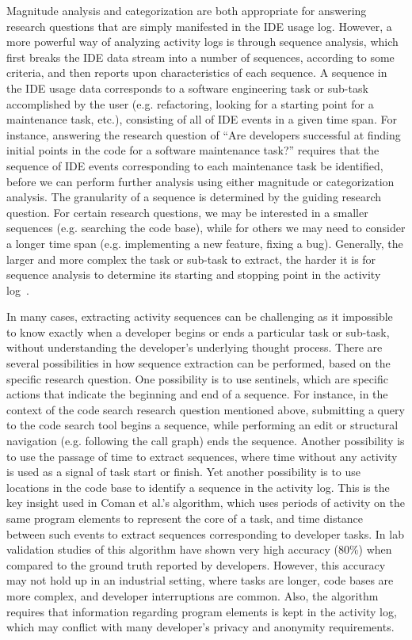 Magnitude analysis and categorization are both appropriate for answering research questions that are simply manifested in the IDE usage log. However, a more powerful way of analyzing activity logs is through sequence analysis, which first breaks the IDE data stream into a number of sequences, according to some criteria, and then reports upon characteristics of each sequence. A sequence in the IDE usage data corresponds to a software engineering task or sub-task accomplished by the user (e.g. refactoring, looking for a starting point for a maintenance task, etc.), consisting of all of IDE events in a given time span. For instance, answering the research question of ``Are developers successful at finding initial points in the code for a software maintenance task?'' requires that the sequence of IDE events corresponding to each maintenance task be identified, before we can perform further analysis using either magnitude or categorization analysis. The granularity of a sequence is determined by the guiding research question. For certain research questions, we may be interested in a smaller sequences (e.g. searching the code base), while for others we may need to consider a longer time span (e.g. implementing a new feature, fixing a bug). 
Generally, the larger and more complex the task or sub-task to extract, the harder it is for sequence analysis to determine its starting and stopping point in the activity log~\cite{Zou-ComanIndustry}.

In many cases, extracting activity sequences can be challenging as it impossible to know exactly when a developer begins or ends a particular task or sub-task, without understanding the developer's underlying thought process. There are several possibilities in how sequence extraction can be performed, based on the specific research question. One possibility is to use sentinels, which are specific actions that indicate the beginning and end of a sequence. For instance, in the context of the code search research question mentioned above, submitting a query to the code search tool begins a sequence, while performing an edit or structural navigation (e.g. following the call graph) ends the sequence. Another possibility is to use the passage of time to extract sequences, where time without any activity is used as a signal of task start or finish. Yet another possibility is to use locations in the code base to identify a sequence in the activity log. This is the key insight used in Coman et al.'s \cite{Coman-TaskIdent} algorithm, which uses periods of activity on the same program elements to represent the core of a task, and time distance between such events to extract sequences corresponding to developer tasks. In lab validation studies of this algorithm have shown very high accuracy (80\%) when compared to the ground truth reported by developers. However, this accuracy may not hold up in an industrial setting\cite{Zou-ComanIndustry}, where tasks are longer, code bases are more complex, and developer interruptions are common. Also, the algorithm requires that information regarding program elements is kept in the activity log, which may conflict with many developer's privacy and anonymity requirements.

